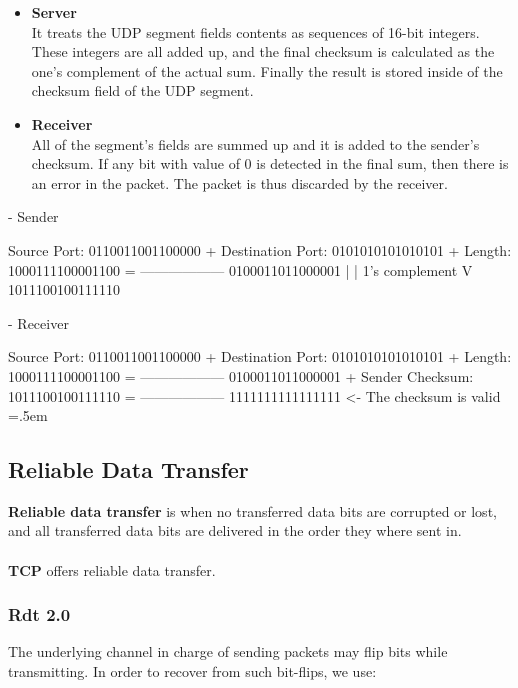 \documentclass{article}
\newenvironment{cverbatim}
 {\SaveVerbatim{cverb}}
 {\endSaveVerbatim
  \flushleft\fboxrule=0pt\fboxsep=.5em
  \colorbox{cverbbg}{\BUseVerbatim{cverb}}%
  \endflushleft
}
\begin{document}
\begin{itemize}
	\item \textbf{Server}
	\vspace{.2cm} \\
	It treats the UDP segment fields contents as sequences of 16-bit integers. These integers are all added up, and the final checksum is calculated as the one's complement of the actual sum. Finally the result is stored inside of the checksum field of the UDP segment.
	
	\item \textbf{Receiver}
	\vspace{.2cm} \\
	All of the segment's fields are summed up and it is added to the sender's checksum. If any bit with value of 0 is detected in the final sum, then there is an error in the packet. The packet is thus discarded by the receiver.
\end{itemize}
\begin{cverbatim}
 - Sender
 
   Source Port:       0110011001100000 +
   Destination Port:  0101010101010101 +
   Length:            1000111100001100 =
                      ------------------
                      0100011011000001 
                              |
                              | 1's complement
                              V
                      1011100100111110
                      
 - Receiver
 
   Source Port:       0110011001100000 +
   Destination Port:  0101010101010101 +
   Length:            1000111100001100 =
                      ------------------
                      0100011011000001 +
   Sender Checksum:   1011100100111110 =
                      ------------------
                      1111111111111111   <- The checksum is valid
\end{cverbatim}

\subsection{Reliable Data Transfer}
\textbf{Reliable data transfer} is when no transferred data bits are corrupted or lost, and all transferred data bits are delivered in the order they where sent in. \\ \\
\textbf{TCP} offers reliable data transfer.

\subsubsection{Rdt 2.0}
The underlying channel in charge of sending packets may flip bits while transmitting. In order to recover from such bit-flips, we use:
\end{document}
